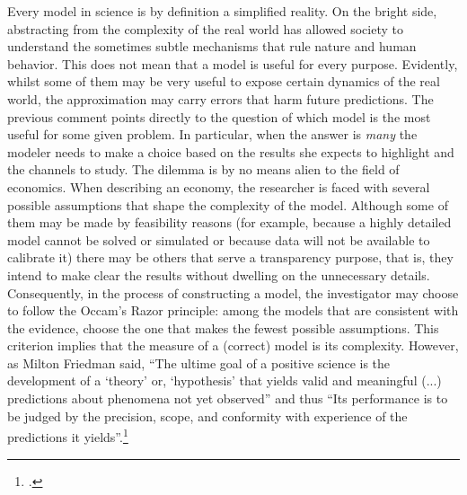 \documentclass[english, a4paper,12pt]{article}
\begin{document}
Every model in science is by definition a simplified reality. On the bright side, abstracting from the complexity of the real world has allowed society to understand the sometimes subtle mechanisms that rule nature and human behavior. This does not mean that a model is useful for every purpose. Evidently, whilst some of them may be very useful to expose certain dynamics of the real world, the approximation may carry errors that harm future predictions. The previous comment points directly to the question of which model is the most useful for some given problem. In particular, when the answer is \textit{many} the modeler needs to make a choice based on the results she expects to highlight and the channels to study. The dilemma is by no means alien to the field of economics. When describing an economy, the researcher is faced with several possible assumptions that shape the complexity of the model. Although some of them may be made by feasibility reasons (for example, because a highly detailed model cannot be solved or simulated or because data will not be available to calibrate it) there may be others that serve a transparency purpose, that is, they intend to make clear the results without dwelling on the unnecessary details. Consequently, in the process of constructing a model, the investigator may choose to follow the Occam's Razor principle: among the models that are consistent with the evidence, choose the one that makes the fewest possible assumptions. This criterion implies that the measure of a (correct) model is its complexity. However, as Milton Friedman said, ``The ultime goal of a positive science is the development of a `theory' or, `hypothesis' that yields valid and meaningful (...) predictions about phenomena not yet observed'' and thus ``Its performance is to be judged by the precision, scope, and conformity with experience of the predictions it yields''.\footnote{\cite{FriedmanPositive}.}
\end{document}
